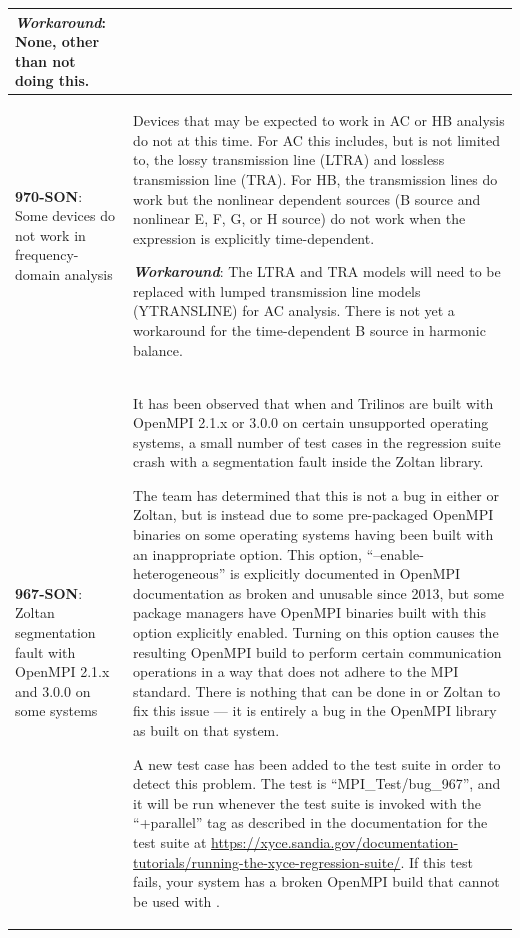 {\begin{longtable}[h] {>{\raggedright\small}m{2in}|>{\raggedright\let\\\tabularnewline\small}m{3.5in}}
\textbf{\textit{Workaround}}: None, other than not doing this.
\\ \hline

\textbf{970-SON}: Some devices do not work in frequency-domain analysis &
Devices that may be expected to work in AC or HB analysis do not at
this time.  For AC this includes, but is not limited to, the lossy
transmission line (LTRA) and lossless transmission line (TRA).  For
HB, the transmission lines do work but the nonlinear dependent sources
(B source and nonlinear E, F, G, or H source) do not work when the
expression is explicitly time-dependent.

\textbf{\textit{Workaround}}: The LTRA and TRA models will need to be replaced
with lumped transmission line models (YTRANSLINE) for AC analysis.
There is not yet a workaround for the time-dependent B source in
harmonic balance.
\\ \hline

\textbf{967-SON}: Zoltan segmentation fault with OpenMPI 2.1.x and 3.0.0 on
some systems &

It has been observed that when \Xyce{} and Trilinos are built with
OpenMPI 2.1.x or 3.0.0 on certain unsupported operating systems, a
small number of test cases in the regression suite crash with a
segmentation fault inside the Zoltan library.

The \Xyce{} team has determined that this is not a bug in
either \Xyce{} or Zoltan, but is instead due to some pre-packaged OpenMPI
binaries on some operating systems having been built with an
inappropriate option.  This option, ``--enable-heterogeneous'' is
explicitly documented in OpenMPI documentation as broken and unusable
since 2013, but some package managers have OpenMPI binaries built with
this option explicitly enabled.  Turning on this option causes the
resulting OpenMPI build to perform certain communication operations in
a way that does not adhere to the MPI standard.  There is nothing that
can be done in \Xyce{} or Zoltan to fix this issue --- it is entirely
a bug in the OpenMPI library as built on that system.

A new test case has been added to the \Xyce{} test suite in order to
detect this problem.  The test is ``MPI\_Test/bug\_967'', and it will
be run whenever the test suite is invoked with the ``+parallel'' tag
as described in the documentation for the test suite
at \url{https://xyce.sandia.gov/documentation-tutorials/running-the-xyce-regression-suite/}.
If this test fails, your system has a broken OpenMPI build that cannot
be used with \Xyce{}.


\end{longtable}}

